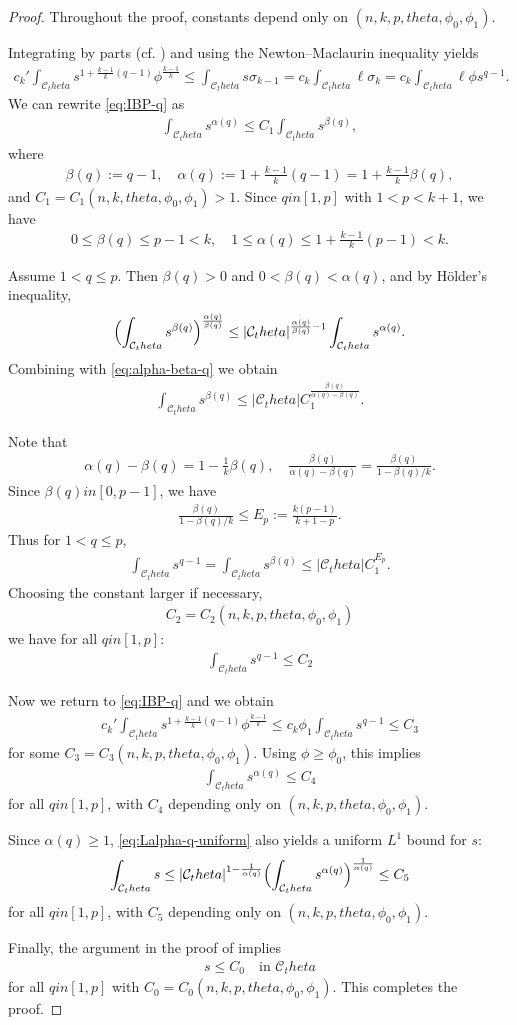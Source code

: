 \documentclass[12pt]{amsart}
\def\theta{theta}%
\def\in{in }%
\numberwithin{equation}{section}
\newcommand{\8}{\infty}
\newcommand{\cC}{\mathcal{C}}
\newcommand{\eq}[1]{\begin{equation}\begin{alignedat}{2}#1\end{alignedat}\end{equation}}
\newcommand{\Cth}{\cC_\theta}
\begin{document}
\begin{proof}
Throughout the proof, constants depend only on
$(n,k,p,\theta,\phi_0,\phi_1)$.

Integrating by parts (cf. \cite[Cor. 2.10]{MWWX25}) and using the
Newton--Maclaurin inequality yields
\eq{\label{eq:IBP-q}
c_k' \int_{\Cth} s^{1+\frac{k-1}{k}(q-1)} \phi^{\frac{k-1}{k}} 
\le \int_{\Cth} s \sigma_{k-1} 
= c_k \int_{\Cth} \ell \sigma_k 
= c_k \int_{\Cth} \ell \phi s^{q-1} .
}
We can rewrite \eqref{eq:IBP-q} as
\eq{\label{eq:alpha-beta-q}
\int_{\cC_\theta} s^{\alpha(q)}
\le C_1 \int_{\cC_\theta} s^{\beta(q)} ,
}
where
\eq{
\beta(q) := q-1, \quad
\alpha(q) := 1 + \frac{k-1}{k}(q-1)
= 1 + \frac{k-1}{k} \beta(q),
}
and $C_1 = C_1(n,k,\theta,\phi_0,\phi_1)>1$.
Since $q\in[1,p]$ with $1<p<k+1$, we have
\eq{
0 \le \beta(q) \le p-1 < k, \quad
1 \le \alpha(q) \le 1 + \frac{k-1}{k}(p-1) <  k.
}

Assume $1<q\le p$. Then $\beta(q)>0$ and $0<\beta(q)<\alpha(q)$,
and by H\"older's inequality,
\eq{
\Bigl( \int_{\cC_\theta} s^{\beta(q)}  \Bigr)^{\frac{\alpha(q)}{\beta(q)}}\le |\cC_\theta|^{\frac{\alpha(q)}{\beta(q)}-1}\int_{\cC_\theta} s^{\alpha(q)}.
}
Combining with \eqref{eq:alpha-beta-q} we obtain
\eq{\label{eq:Lbeta-q}
\int_{\cC_\theta} s^{\beta(q)}
\le
|\cC_\theta| C_1^{\frac{\beta(q)}{\alpha(q)-\beta(q)}}.
}

Note that
\eq{
\alpha(q) - \beta(q)
= 1 - \frac{1}{k} \beta(q),
\quad
\frac{\beta(q)}{\alpha(q)-\beta(q)}
= \frac{\beta(q)}{1-\beta(q)/k}.
}
Since $\beta(q)\in[0,p-1]$, we have
\eq{
\frac{\beta(q)}{1-\beta(q)/k} \le E_p :=  \frac{k(p-1)}{k+1-p}.
}
Thus for $1<q\le p$,
\eq{
\int_{\cC_\theta} s^{q-1}
= \int_{\cC_\theta} s^{\beta(q)} 
\le
|\cC_\theta| C_1^{E_p}.
}
Choosing the constant larger if necessary,
\eq{
C_2 = C_2(n,k,p,\theta,\phi_0,\phi_1)
}
we have for all $q\in[1,p]$:
\eq{\label{eq:Lq-1-uniform}
\int_{\cC_\theta} s^{q-1}  \le C_2
}

Now we return to \eqref{eq:IBP-q} and we obtain
\eq{
c_k' \int_{\Cth} s^{1+\frac{k-1}{k}(q-1)} \phi^{\frac{k-1}{k}}
\le
c_k \phi_1
\int_{\Cth} s^{q-1} 
\le
C_3
}
for some $C_3 = C_3(n,k,p,\theta,\phi_0,\phi_1)$.
Using $\phi\ge\phi_0$, this implies
\eq{\label{eq:Lalpha-q-uniform}
\int_{\Cth} s^{\alpha(q)}  \le C_4
}
for all $q\in[1,p]$, with $C_4$ depending only on
$(n,k,p,\theta,\phi_0,\phi_1)$.

Since $\alpha(q)\ge 1$,
\eqref{eq:Lalpha-q-uniform} also yields a uniform $L^1$ bound for $s$:
\eq{
\int_{\cC_\theta} s 
\le |\cC_\theta|^{1-\frac1{\alpha(q)}}
\Bigl( \int_{\cC_\theta} s^{\alpha(q)} \Bigr)^{\frac1{\alpha(q)}}
\le C_5
}
for all $q\in[1,p]$, with $C_5$ depending only on
$(n,k,p,\theta,\phi_0,\phi_1)$.

Finally, the argument in the proof of \cite[Lem. 4.6]{HIS25} implies
\eq{
s \le C_0 \quad\text{in } \cC_\theta
}
for all $q\in[1,p]$ with $C_0 = C_0(n,k,p,\theta,\phi_0,\phi_1)$. This completes the proof.
\end{proof}
\end{document}
